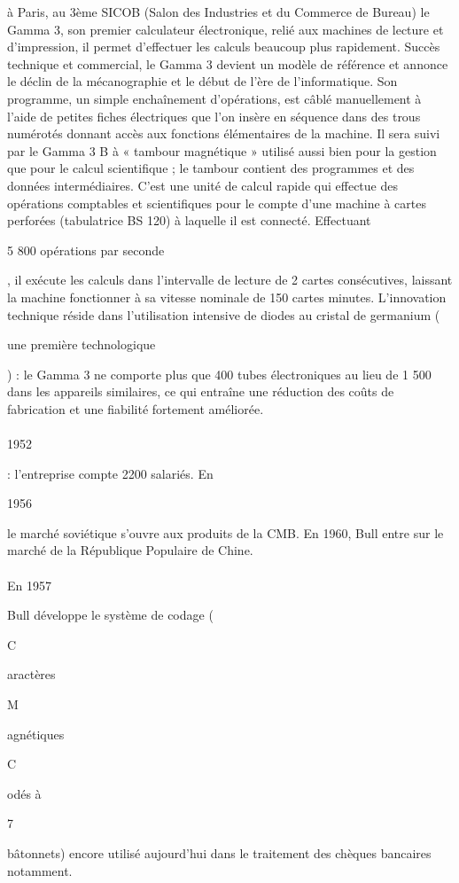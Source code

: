\documentclass{article}
\begin{document}
		à Paris, au 3ème SICOB (Salon des Industries et du Commerce de Bureau) le Gamma 3, son premier calculateur électronique, 
		relié aux machines de lecture et d’impression, il permet d’effectuer les calculs beaucoup plus rapidement. 
		Succès technique et commercial, le Gamma 3 devient un modèle de référence et annonce le déclin de la mécanographie et 
		le début de l’ère de l’informatique. Son programme, un simple enchaînement d’opérations, est câblé manuellement à 
		l’aide de petites fiches électriques que l’on insère en séquence dans des trous numérotés donnant accès aux fonctions 
		élémentaires de la machine. Il sera suivi par le Gamma 3 B à « tambour magnétique » utilisé aussi bien pour la gestion 
		que pour le calcul scientifique ; le tambour contient des programmes et des données intermédiaires. C'est une unité de 
		calcul rapide qui effectue des opérations comptables et scientifiques pour le compte d'une machine à cartes perforées 
		(tabulatrice BS 120) à laquelle il est connecté. Effectuant \begin{bf}5 800 opérations par seconde\end{bf}, 
		il exécute les calculs dans l’intervalle de lecture de 2 cartes consécutives, laissant la machine fonctionner à sa 
		vitesse nominale de 150 cartes minutes. L'innovation technique réside dans l'utilisation intensive de diodes au 
		cristal de germanium (\begin{bf}une première technologique\end{bf}) : le Gamma 3 ne comporte plus que 400 tubes 
		électroniques au lieu de 1 500 dans les appareils similaires, ce qui entraîne une réduction des coûts de fabrication 
		et une fiabilité fortement améliorée.
		\paragraph{}
		\begin{bf}1952\end{bf}: l’entreprise compte 2200 salariés. En \begin{bf}1956\end{bf} le marché soviétique s'ouvre 
		aux produits de la CMB. En 1960, Bull entre sur le marché de la République Populaire de Chine.
		\paragraph{}
		\begin{bf}En 1957\end{bf} Bull développe le système de codage (\begin{bf}C\end{bf}aractères \begin{bf}M\end{bf}agnétiques 
		\begin{bf}C\end{bf}odés à \begin{bf}7\end{bf} bâtonnets) encore utilisé aujourd’hui dans le traitement des chèques 
		bancaires notamment.
\end{document}
